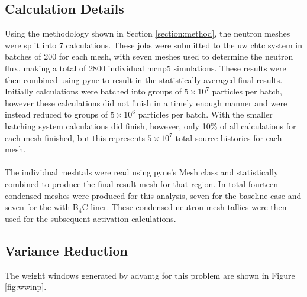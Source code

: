 \documentclass[12pt]{article}
\begin{document}
\subsection{Calculation Details}
Using the methodology shown in Section \ref{section:method}, the neutron meshes
were split into 7 calculations. These jobs were submitted to the \gls{uw}
\gls{chtc} system in batches of 200 for each mesh, with seven meshes used to
determine the neutron flux, making a
total of 2800 individual \gls{mcnp5} simulations. These results were then
combined using \gls{pyne} to result in the statistically averaged final results.
Initially calculations were batched into groups of $5\times10^7$ particles per
batch, however these calculations did not finish in a timely enough manner and
were instead reduced to groups of $5\times10^6$ particles per batch. With the
smaller batching system calculations did finish, however, only 10\% of all
calculations for each mesh finished, but this represents $5\times10^7$ total
source histories for each mesh.
\\
\\
The individual meshtals were read using \gls{pyne}'s Mesh class and statistically
combined to produce the final result mesh for that region. In total fourteen 
condensed meshes were produced for this analysis, seven for the baseline case
and seven for the with B$_4$C liner. These condensed neutron mesh tallies were
then used for the subsequent activation calculations.

\subsection{Variance Reduction}
The weight windows generated by \gls{advantg} for this problem are shown in Figure
\ref{fig:wwinp}. 
\end{document}

